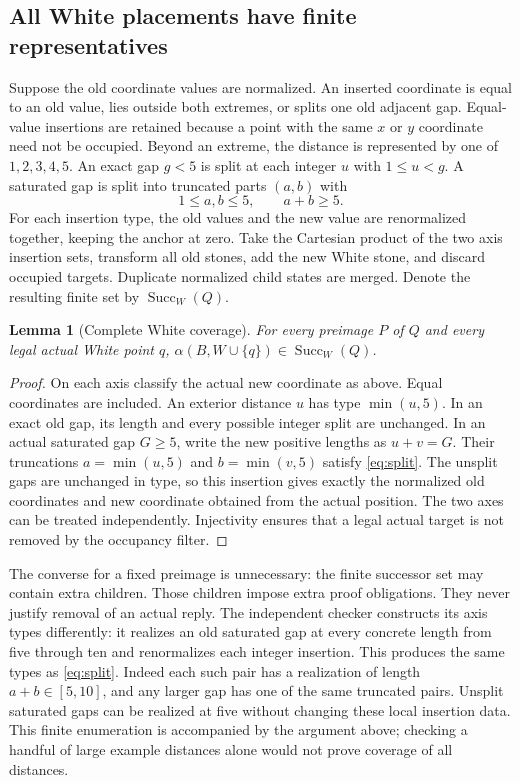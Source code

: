 \documentclass[11pt]{article}
\newtheorem{lemma}[theorem]{Lemma}
\theoremstyle{definition}
\theoremstyle{remark}
\newcommand{\A}{\alpha}
\newcommand{\Succ}{\operatorname{Succ}}
\begin{document}
\subsection{All White placements have finite representatives}
Suppose the old coordinate values are normalized. An inserted coordinate
is equal to an old value, lies outside both extremes, or splits one old
adjacent gap. Equal-value insertions are retained because a point with the
same $x$ or $y$ coordinate need not be occupied. Beyond an extreme, the
distance is represented by one of $1,2,3,4,5$. An exact gap $g<5$ is split
at each integer $u$ with $1\leq u<g$. A saturated gap is split into
truncated parts $(a,b)$ with
\begin{equation}
 \label{eq:split}
 1\leq a,b\leq5,\qquad a+b\geq5.
\end{equation}
For each insertion type, the old values and the new value are renormalized
together, keeping the anchor at zero. Take the Cartesian product of the
two axis insertion sets, transform all old stones, add the new White
stone, and discard occupied targets. Duplicate normalized child states
are merged. Denote the resulting finite set by $\Succ_W(Q)$.

\begin{lemma}[Complete White coverage]
\label{lem:white}
For every preimage $P$ of $Q$ and every legal actual White point $q$,
$\A(B,W\cup\{q\})\in\Succ_W(Q)$.
\end{lemma}
\begin{proof}
On each axis classify the actual new coordinate as above. Equal coordinates
are included. An exterior distance $u$ has type $\min(u,5)$. In an exact
old gap, its length and every possible integer split are unchanged. In an
actual saturated gap $G\geq5$, write the new positive lengths as
$u+v=G$. Their truncations $a=\min(u,5)$ and $b=\min(v,5)$ satisfy
\eqref{eq:split}. The unsplit gaps are unchanged in type, so this insertion
gives exactly the normalized old coordinates and new coordinate obtained
from the actual position. The two axes can be treated independently.
Injectivity ensures that a legal actual target is not removed by the
occupancy filter.
\end{proof}

The converse for a fixed preimage is unnecessary: the finite successor set
may contain extra children. Those children impose extra proof obligations.
They never justify removal of an actual reply. The independent checker
constructs its axis types differently: it realizes an old saturated gap at
every concrete length from five through ten and renormalizes each integer
insertion. This produces the same types as \eqref{eq:split}. Indeed each
such pair has a realization of length $a+b\in[5,10]$, and any larger gap
has one of the same truncated pairs. Unsplit saturated gaps can be realized
at five without changing these local insertion data. This finite enumeration
is accompanied by the argument above; checking a handful of large example
distances alone would not prove coverage of all distances.
\end{document}
